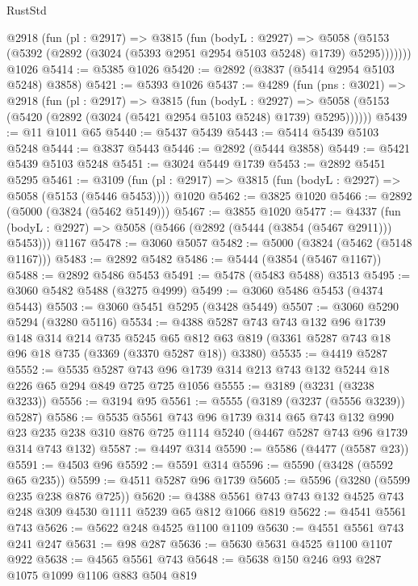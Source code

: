 \begin{lexlean}{RustStd}
\begin{coremodule}
      @2918
        (fun (pl : @2917) =>
        @3815
          (fun (bodyL : @2927) =>
          @5058 (@5153 (@5392 (@2892 (@3024 (@5393 @2951 @2954 @5103 @5248) @1739) @5295)))))))
    @1026
@5414 := @5385 @1026
@5420 := @2892 (@3837 (@5414 @2954 @5103 @5248) @3858)
@5421 := @5393 @1026
@5437 := @4289
    (fun (pns : @3021) =>
    @2918
      (fun (pl : @2917) =>
      @3815
        (fun (bodyL : @2927) =>
        @5058 (@5153 (@5420 (@2892 (@3024 (@5421 @2954 @5103 @5248) @1739) @5295))))))
@5439 := @11 @1011 @65
@5440 := @5437 @5439
@5443 := @5414 @5439 @5103 @5248
@5444 := @3837 @5443
@5446 := @2892 (@5444 @3858)
@5449 := @5421 @5439 @5103 @5248
@5451 := @3024 @5449 @1739
@5453 := @2892 @5451 @5295
@5461 := @3109
    (fun (pl : @2917) => @3815 (fun (bodyL : @2927) => @5058 (@5153 (@5446 @5453))))
    @1020
@5462 := @3825 @1020
@5466 := @2892 (@5000 (@3824 (@5462 @5149)))
@5467 := @3855 @1020
@5477 := @4337
    (fun (bodyL : @2927) => @5058 (@5466 (@2892 (@5444 (@3854 (@5467 @2911))) @5453)))
    @1167
@5478 := @3060 @5057
@5482 := @5000 (@3824 (@5462 (@5148 @1167)))
@5483 := @2892 @5482
@5486 := @5444 (@3854 (@5467 @1167))
@5488 := @2892 @5486 @5453
@5491 := @5478 (@5483 @5488) @3513
@5495 := @3060 @5482 @5488 (@3275 @4999)
@5499 := @3060 @5486 @5453 (@4374 @5443)
@5503 := @3060 @5451 @5295 (@3428 @5449)
@5507 := @3060 @5290 @5294 (@3280 @5116)
@5534 := @4388
    @5287
    @743
    @743
    @132
    @96
    @1739
    @148
    @314
    @214
    @735
    @5245
    @65
    @812
    @63
    @819
    (@3361 @5287 @743 @18 @96 @18 @735 (@3369 (@3370 @5287 @18)) @3380)
@5535 := @4419 @5287
@5552 := @5535 @5287 @743 @96 @1739 @314 @213 @743 @132 @5244 @18 @226 @65 @294 @849 @725 @725 @1056
@5555 := @3189 (@3231 (@3238 @3233))
@5556 := @3194 @95
@5561 := @5555 (@3189 (@3237 (@5556 @3239)) @5287)
@5586 := @5535
    @5561
    @743
    @96
    @1739
    @314
    @65
    @743
    @132
    @990
    @23
    @235
    @238
    @310
    @876
    @725
    @1114
    @5240
    (@4467 @5287 @743 @96 @1739 @314 @743 @132)
@5587 := @4497 @314
@5590 := @5586 (@4477 (@5587 @23))
@5591 := @4503 @96
@5592 := @5591 @314
@5596 := @5590 (@3428 (@5592 @65 @235))
@5599 := @4511 @5287 @96 @1739
@5605 := @5596 (@3280 (@5599 @235 @238 @876 @725))
@5620 := @4388 @5561 @743 @743 @132 @4525 @743 @248 @309 @4530 @1111 @5239 @65 @812 @1066 @819
@5622 := @4541 @5561 @743
@5626 := @5622 @248 @4525 @1100 @1109
@5630 := @4551 @5561 @743 @241 @247
@5631 := @98 @287
@5636 := @5630 @5631 @4525 @1100 @1107 @922
@5638 := @4565 @5561 @743
@5648 := @5638 @150 @246 @93 @287 @1075 @1099 @1106 @883 @504 @819

\end{coremodule}
\end{lexlean}
